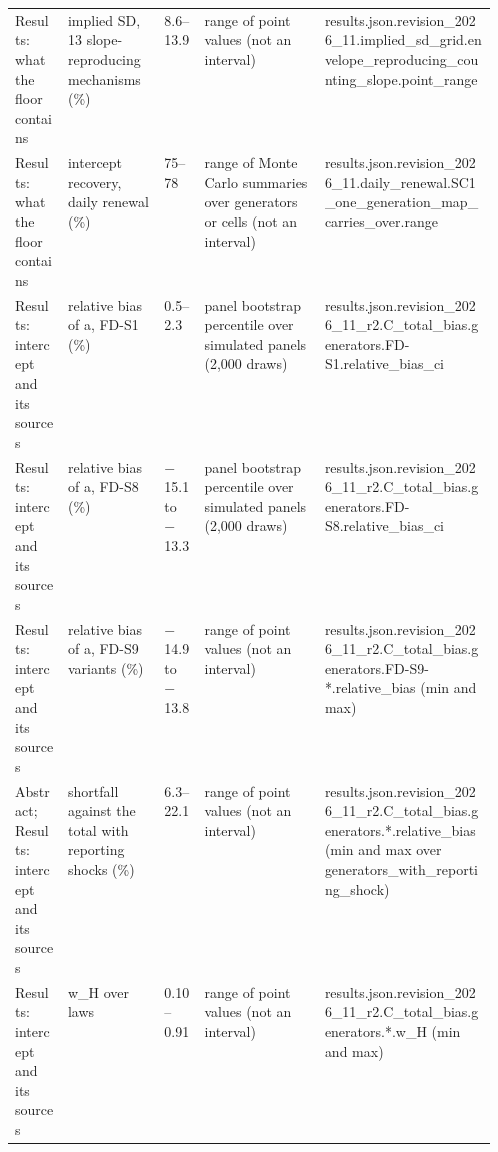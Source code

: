\begin{table}[!tbp]
\begin{tabularx}{\linewidth}{@{}p{0.11\linewidth}p{0.2\linewidth}lp{0.25\linewidth}X@{}}
Results: what the floor contains & implied SD, 13 slope-reproducing mechanisms (\%) & 8.6--13.9 & range of point values (not an interval) & {\ttfamily\tiny results.\allowbreak{}json.\allowbreak{}revision\_2026\_11.\allowbreak{}implied\_sd\_grid.\allowbreak{}envelope\_reproducing\_counting\_slope.\allowbreak{}point\_range} \\
Results: what the floor contains & intercept recovery, daily renewal (\%) & 75--78 & range of Monte Carlo summaries over generators or cells (not an interval) & {\ttfamily\tiny results.\allowbreak{}json.\allowbreak{}revision\_2026\_11.\allowbreak{}daily\_renewal.\allowbreak{}SC1\_one\_generation\_map\_carries\_over.\allowbreak{}range} \\
Results: intercept and its sources & relative bias of a, FD-S1 (\%) & 0.5--2.3 & panel bootstrap percentile over simulated panels (2,000 draws) & {\ttfamily\tiny results.\allowbreak{}json.\allowbreak{}revision\_2026\_11\_r2.\allowbreak{}C\_total\_bias.\allowbreak{}generators.\allowbreak{}FD-S1.\allowbreak{}relative\_bias\_ci} \\
Results: intercept and its sources & relative bias of a, FD-S8 (\%) & $-$15.1 to $-$13.3 & panel bootstrap percentile over simulated panels (2,000 draws) & {\ttfamily\tiny results.\allowbreak{}json.\allowbreak{}revision\_2026\_11\_r2.\allowbreak{}C\_total\_bias.\allowbreak{}generators.\allowbreak{}FD-S8.\allowbreak{}relative\_bias\_ci} \\
Results: intercept and its sources & relative bias of a, FD-S9 variants (\%) & $-$14.9 to $-$13.8 & range of point values (not an interval) & {\ttfamily\tiny results.\allowbreak{}json.\allowbreak{}revision\_2026\_11\_r2.\allowbreak{}C\_total\_bias.\allowbreak{}generators.\allowbreak{}FD-S9-*.\allowbreak{}relative\_bias (min and max)} \\
Abstract; Results: intercept and its sources & shortfall against the total with reporting shocks (\%) & 6.3--22.1 & range of point values (not an interval) & {\ttfamily\tiny results.\allowbreak{}json.\allowbreak{}revision\_2026\_11\_r2.\allowbreak{}C\_total\_bias.\allowbreak{}generators.\allowbreak{}*.\allowbreak{}relative\_bias (min and max over generators\_with\_reporting\_shock)} \\
Results: intercept and its sources & w\_H over laws & 0.10--0.91 & range of point values (not an interval) & {\ttfamily\tiny results.\allowbreak{}json.\allowbreak{}revision\_2026\_11\_r2.\allowbreak{}C\_total\_bias.\allowbreak{}generators.\allowbreak{}*.\allowbreak{}w\_H (min and max)} \\

\end{tabularx}
\end{table}

